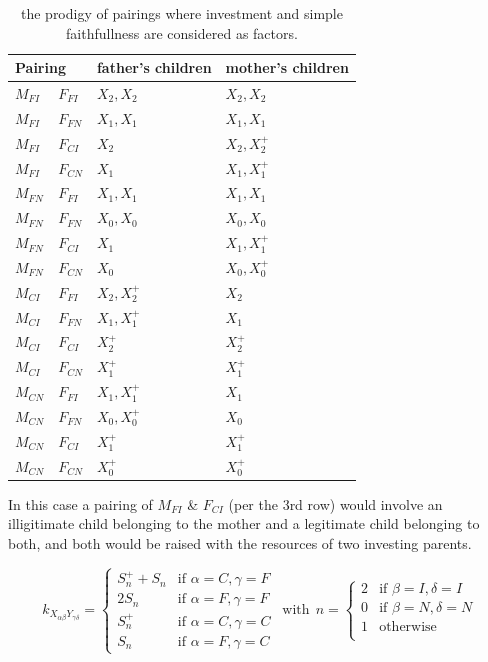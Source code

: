 \documentclass[journal,article,accept,oneauthors,pdftex,10pt,a4paper]{mdpi}
\begin{document}
\begin{table}[H]
    \centering
    \begin{tabular}{|ll|l|l|}
        \hline
        \multicolumn{2}{|l|}{Pairing} & father's children & mother's children \\
        \hline
        $M_{FI}$ & $F_{FI}$ & $X_2,X_2$ & $X_2,X_2$ \\
        $M_{FI}$ & $F_{FN}$ & $X_1,X_1$ & $X_1,X_1$ \\
        $M_{FI}$ & $F_{CI}$ & $X_2$ & $X_2,X^+_2$ \\
        $M_{FI}$ & $F_{CN}$ & $X_1$ & $X_1,X^+_1$ \\
        \hline
        $M_{FN}$ & $F_{FI}$ & $X_1,X_1$ & $X_1,X_1$ \\
        $M_{FN}$ & $F_{FN}$ & $X_0,X_0$ & $X_0,X_0$ \\
        $M_{FN}$ & $F_{CI}$ & $X_1$ & $X_1,X^+_1$ \\
        $M_{FN}$ & $F_{CN}$ & $X_0$ & $X_0,X^+_0$ \\
        \hline
        $M_{CI}$ & $F_{FI}$ & $X_2,X^+_2$ & $X_2$ \\
        $M_{CI}$ & $F_{FN}$ & $X_1,X^+_1$ & $X_1$ \\
        $M_{CI}$ & $F_{CI}$ & $X^+_2$ & $X^+_2$ \\
        $M_{CI}$ & $F_{CN}$ & $X^+_1$ & $X^+_1$ \\
        \hline
        $M_{CN}$ & $F_{FI}$ & $X_1,X^+_1$ & $X_1$ \\
        $M_{CN}$ & $F_{FN}$ & $X_0,X^+_0$ & $X_0$ \\
        $M_{CN}$ & $F_{CI}$ & $X^+_1$ & $X^+_1$ \\
        $M_{CN}$ & $F_{CN}$ & $X^+_0$ & $X^+_0$ \\
        \hline
    \end{tabular}
    \caption{the prodigy of pairings where investment and simple faithfullness are considered as factors.}\label{table:outcomes}
\end{table}

In this case a pairing of $M_{FI}$ \& $F_{CI}$ (per the 3rd row) would involve an illigitimate child belonging to the mother and a legitimate child belonging to both, and both would be raised with the resources of two investing parents.

$$ k_{X_{\alpha\beta}Y_{\gamma\delta}} =
\left\{
	\begin{array}{ll}
		S^+_n+S_n   & \mbox{if } \alpha=C,\gamma=F \\
		2S_n        & \mbox{if } \alpha=F,\gamma=F \\
		S^+_n       & \mbox{if } \alpha=C,\gamma=C \\
		S_n         & \mbox{if } \alpha=F,\gamma=C
	\end{array}
\right.~~\text{with}~~n= \left\{
	\begin{array}{ll}
		2   & \mbox{if } \beta=I,\delta=I \\
		0   & \mbox{if } \beta=N,\delta=N \\
		1   & \mbox{otherwise }  \\
	\end{array}
\right.$$
\end{document}
